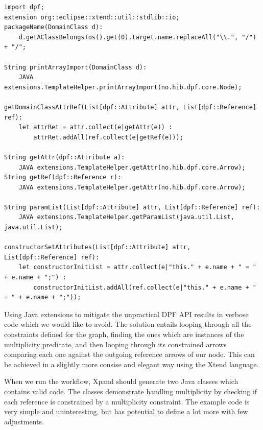 \lstset{caption=Listing shows the Xtend extensions for our generator.,label=list:xtendextension,captionpos=b,breaklines=true}
\begin{table}[h!]
  \centering  
  \begin{lstlisting}[showstringspaces=false]
import dpf;
extension org::eclipse::xtend::util::stdlib::io;
packageName(DomainClass d):
    d.getAClassBelongsTos().get(0).target.name.replaceAll("\\.", "/") + "/";
    
String printArrayImport(DomainClass d):
    JAVA extensions.TemplateHelper.printArrayImport(no.hib.dpf.core.Node);

getDomainClassAttrRef(List[dpf::Attribute] attr, List[dpf::Reference] ref):
    let attrRet = attr.collect(e|getAttr(e)) :
        attrRet.addAll(ref.collect(e|getRef(e)));
        
String getAttr(dpf::Attribute a):
    JAVA extensions.TemplateHelper.getAttr(no.hib.dpf.core.Arrow);
String getRef(dpf::Reference r):
    JAVA extensions.TemplateHelper.getAttr(no.hib.dpf.core.Arrow);
    
String paramList(List[dpf::Attribute] attr, List[dpf::Reference] ref):
    JAVA extensions.TemplateHelper.getParamList(java.util.List, java.util.List);
    
constructorSetAttributes(List[dpf::Attribute] attr, List[dpf::Reference] ref):
    let constructorInitList = attr.collect(e|"this." + e.name + " = " + e.name + ";") :
        constructorInitList.addAll(ref.collect(e|"this." + e.name + " = " + e.name + ";"));
  \end{lstlisting}
\end{table}
Using Java extensions to mitigate the unpractical DPF API results in verbose code which we would like to avoid. The solution entails looping through all the constraints defined for the graph, finding the ones which are instances of the multiplicity predicate, and then looping through its constrained arrows comparing each one against the outgoing reference arrows of our  node. This can be achieved in a slightly more consise and elegant way using the Xtend language.

When we run the workflow, Xpand should generate two Java classes which contains valid code. The classes demonstrate handling multiplicity by checking if each reference is constrained by a multiplicity constraint. The example code is very simple and uninteresting, but has potential to define a lot more with few adjustments.

